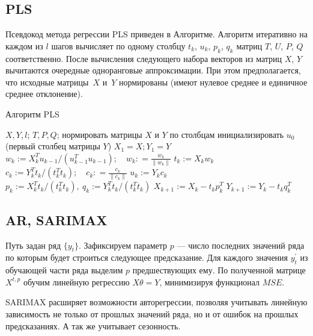 \documentclass{article}
\begin{document}
\subsection{PLS}
Псевдокод метода регрессии PLS приведен в Алгоритме.
Алгоритм итеративно на каждом из $l$ шагов вычисляет по одному столбцу $t_k$, $u_k$, $p_k$, $q_k$ матриц $T$, $U$, $P$, $Q$ соответственно. 
После вычисления следующего набора векторов из матриц $X$, $Y$ вычитаются очередные одноранговые аппроксимации. 
При этом предполагается, что исходные матрицы~$X$ и~$Y$ нормированы (имеют нулевое среднее и единичное среднее отклонение).

\begin{algorithm}[h]
	\caption{Алгоритм PLS}
	\label{ch1:pls_pseudocode}
	\begin{algorithmic}[1]
		\REQUIRE $X, Y, l$;
		\ENSURE $T, P, Q$;
		\STATE нормировать матрицы $X$ и $Y$ по столбцам
		\STATE инициализировать $u_0$ (первый столбец матрицы $Y$)
		\STATE $X_1 = X; Y_1 = Y$
		\REPEAT
		\vspace{0.1cm}
		\STATE $w_k := X_k^{T} u_{k-1} / (u_{k-1}^{T} u_{k-1}); \quad w_k: = \frac{w_k}{\| w_k \|}$
		\vspace{0.1cm}
		\STATE $t_k := X_k w_k$
		\vspace{0.1cm}
		\STATE $c_k := Y_k^{T} t_k / (t_k^{T} t_k); \quad c_k: = \frac{c_k}{\| c_k \|}$
		\vspace{0.1cm}
		\STATE $u_k := Y_k c_k$
		\vspace{0.1cm}
		\STATE $p_k:= X_k^{T}t_k/(t_k^{T}t_k),\ 
		q_k := Y_k^{T}t_k/(t_k^{T}t_k)$
		\vspace{0.2cm}
		\STATE $X_{k+1} :=  X_k - t_k p_k^{T}$
		\vspace{0.2cm}
		\STATE $Y_{k + 1} :=  Y_k - t_k q_k^{T}$ 
		\ENDFOR
	\end{algorithmic}
\end{algorithm}
\subsection{AR, SARIMAX}

Путь задан ряд $\{y_t\}$. Зафиксируем параметр $p$ --- число последних значений ряда по которым будет строиться следующее предсказание. Для каждого значения $y_t^{'}$ из обучающей части ряда выделим $p$ предшествующих ему. По полученной матрице $X^{t, p}$ обучим линейную регрессию $X\theta = Y$, минимизируя функционал $MSE$.

\par
SARIMAX расширяет возможности авторегрессии, позволяя учитывать линейную зависимость не только от прошлых значений ряда, но и от ошибок на прошлых предсказаниях. А так же учитывает сезонность.
\end{document}
